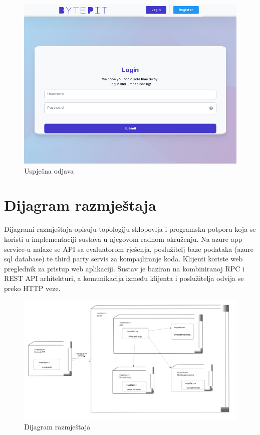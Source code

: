 			\begin{figure}[H]
				\includegraphics[scale=0.50]{slike/screen_after_logout.PNG}
				\centering
				\caption{Uspješna odjava}
				\label{fig:sucess_logout}
			\end{figure}
			
			
			\eject 
		
		
		\section{Dijagram razmještaja}

			 Dijagrami razmještaja opisuju topologiju sklopovlja i programsku potporu koja se koristi u implementaciji sustava u njegovom radnom okruženju.
			 Na azure app service-u nalaze se API sa evaluatorom rješenja, poslužitelj baze podataka (azure sql database) te third party servis za kompajliranje koda.
			 Klijenti koriste web preglednik za pristup web aplikaciji. Sustav je baziran na kombiniranoj RPC i REST API arhitekturi, a komunikacija između klijenta i poslužitelja odvija se preko HTTP veze.

			 
			
			\begin{figure}[H]
				\includegraphics[width=\linewidth]{slike/dijagram_razmjestaja.png} 
				\centering
				\caption{Dijagram razmještaja}
				\label{fig:razmjestaj}
			\end{figure}
			\eject 
		

